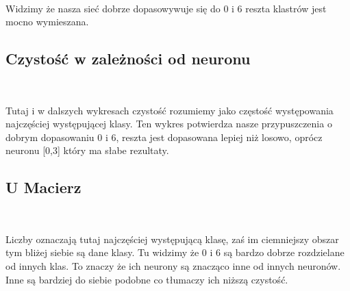 \documentclass[11pt]{article}
\begin{document}
            
        
    \begin{center}
    \end{center}
    { \hspace*{\fill} \\}
    
    Widzimy że nasza sieć dobrze dopasowywuje się do 0 i 6 reszta klastrów
jest mocno wymieszana.

    \hypertarget{czystoux15bux107-w-zaleux17cnoux15bci-od-neuronu}{%
\subsection{Czystość w zależności od
neuronu}\label{czystoux15bux107-w-zaleux17cnoux15bci-od-neuronu}}

            
        
    \begin{center}
    \end{center}
    { \hspace*{\fill} \\}
    
    Tutaj i w dalszych wykresach czystość rozumiemy jako częstość
występowania najczęściej występującej klasy. Ten wykres potwierdza nasze
przypuszczenia o dobrym dopasowaniu 0 i 6, reszta jest dopasowana lepiej
niż losowo, oprócz neuronu {[}0,3{]} który ma słabe rezultaty.

    \hypertarget{u-macierz}{%
\subsection{U Macierz}\label{u-macierz}}

            
        
    \begin{center}
    \end{center}
    { \hspace*{\fill} \\}
    
    Liczby oznaczają tutaj najczęściej występującą klasę, zaś im ciemniejszy
obszar tym bliżej siebie są dane klasy. Tu widzimy że 0 i 6 są bardzo
dobrze rozdzielane od innych klas. To znaczy że ich neurony są znacząco
inne od innych neuronów. Inne są bardziej do siebie podobne co tłumaczy
ich niższą czystość.
\end{document}
